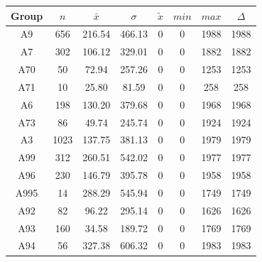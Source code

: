 \begin{figure}[ht!]
	\centering
	\begin{minipage}{0.5\textwidth}
		\tiny
		\centering
		\begin{tabular}{c|c|c|c|c|c|c|c}
			\toprule
			Group & $n$ & $\bar{x}$ & $\sigma$ & $\tilde{x}$ & $min$ & $max$ & $\Delta$ \\
			\midrule
			A9   & 656  & 216.54 & 466.13 & 0 & 0 & 1988 & 1988 \\ 
			A7   & 302  & 106.12 & 329.01 & 0 & 0 & 1882 & 1882 \\ 
			A70  & 50   & 72.94  & 257.26 & 0 & 0 & 1253 & 1253 \\ 
			A71  & 10   & 25.80  & 81.59  & 0 & 0 & 258  & 258  \\ 
			A6   & 198  & 130.20 & 379.68 & 0 & 0 & 1968 & 1968 \\ 
			A73  & 86   & 49.74  & 245.74 & 0 & 0 & 1924 & 1924 \\ 
			A3   & 1023 & 137.75 & 381.13 & 0 & 0 & 1979 & 1979 \\ 
			A99  & 312  & 260.51 & 542.02 & 0 & 0 & 1977 & 1977 \\ 
			A96  & 230  & 146.79 & 395.78 & 0 & 0 & 1958 & 1958 \\ 
			A995 & 14   & 288.29 & 545.94 & 0 & 0 & 1749 & 1749 \\ 
			A92  & 82   & 96.22  & 295.14 & 0 & 0 & 1626 & 1626 \\ 
			A93  & 160  & 34.58  & 189.72 & 0 & 0 & 1769 & 1769 \\ 
			A94  & 56   & 327.38 & 606.32 & 0 & 0 & 1983 & 1983 \\ 
			\bottomrule
		\end{tabular}
		\label{tbl:descriptives_arbis_matched_Strasse_SDist}
	\end{minipage}%
	\begin{minipage}{0.55\textwidth}
\end{minipage}
\end{figure}
